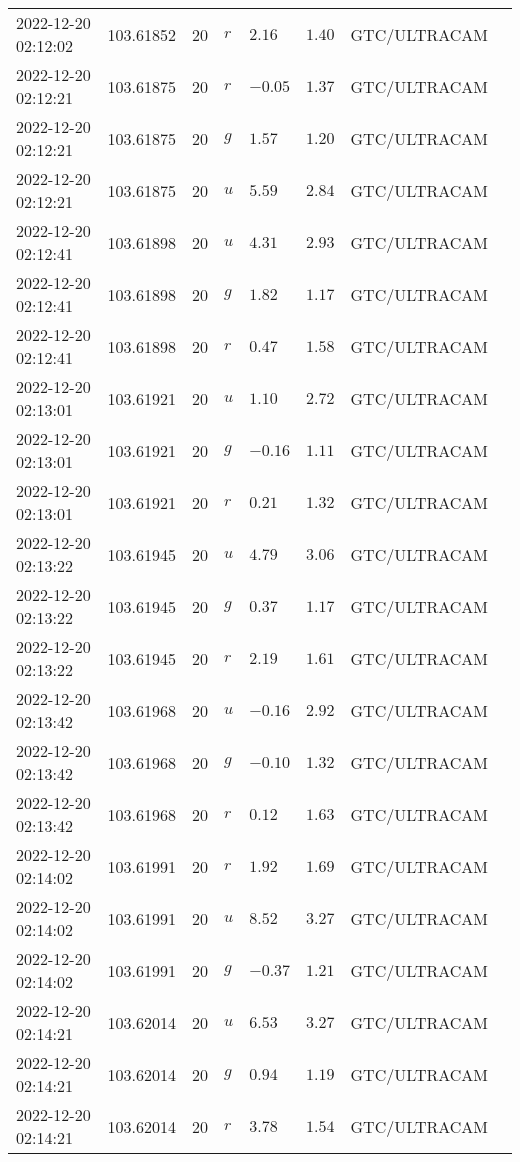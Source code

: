 \documentclass{nature_plusfigure}
\begin{document}
\begin{supplement}
\begin{center}
\begin{longtable}{llllllll}
2022-12-20 02:12:02 & 103.61852 & 20 & $r$ & $2.16$ & $1.40$ & GTC/ULTRACAM &  \\ 
2022-12-20 02:12:21 & 103.61875 & 20 & $r$ & $-0.05$ & $1.37$ & GTC/ULTRACAM &  \\ 
2022-12-20 02:12:21 & 103.61875 & 20 & $g$ & $1.57$ & $1.20$ & GTC/ULTRACAM &  \\ 
2022-12-20 02:12:21 & 103.61875 & 20 & $u$ & $5.59$ & $2.84$ & GTC/ULTRACAM &  \\ 
2022-12-20 02:12:41 & 103.61898 & 20 & $u$ & $4.31$ & $2.93$ & GTC/ULTRACAM &  \\ 
2022-12-20 02:12:41 & 103.61898 & 20 & $g$ & $1.82$ & $1.17$ & GTC/ULTRACAM &  \\ 
2022-12-20 02:12:41 & 103.61898 & 20 & $r$ & $0.47$ & $1.58$ & GTC/ULTRACAM &  \\ 
2022-12-20 02:13:01 & 103.61921 & 20 & $u$ & $1.10$ & $2.72$ & GTC/ULTRACAM &  \\ 
2022-12-20 02:13:01 & 103.61921 & 20 & $g$ & $-0.16$ & $1.11$ & GTC/ULTRACAM &  \\ 
2022-12-20 02:13:01 & 103.61921 & 20 & $r$ & $0.21$ & $1.32$ & GTC/ULTRACAM &  \\ 
2022-12-20 02:13:22 & 103.61945 & 20 & $u$ & $4.79$ & $3.06$ & GTC/ULTRACAM &  \\ 
2022-12-20 02:13:22 & 103.61945 & 20 & $g$ & $0.37$ & $1.17$ & GTC/ULTRACAM &  \\ 
2022-12-20 02:13:22 & 103.61945 & 20 & $r$ & $2.19$ & $1.61$ & GTC/ULTRACAM &  \\ 
2022-12-20 02:13:42 & 103.61968 & 20 & $u$ & $-0.16$ & $2.92$ & GTC/ULTRACAM &  \\ 
2022-12-20 02:13:42 & 103.61968 & 20 & $g$ & $-0.10$ & $1.32$ & GTC/ULTRACAM &  \\ 
2022-12-20 02:13:42 & 103.61968 & 20 & $r$ & $0.12$ & $1.63$ & GTC/ULTRACAM &  \\ 
2022-12-20 02:14:02 & 103.61991 & 20 & $r$ & $1.92$ & $1.69$ & GTC/ULTRACAM &  \\ 
2022-12-20 02:14:02 & 103.61991 & 20 & $u$ & $8.52$ & $3.27$ & GTC/ULTRACAM &  \\ 
2022-12-20 02:14:02 & 103.61991 & 20 & $g$ & $-0.37$ & $1.21$ & GTC/ULTRACAM &  \\ 
2022-12-20 02:14:21 & 103.62014 & 20 & $u$ & $6.53$ & $3.27$ & GTC/ULTRACAM &  \\ 
2022-12-20 02:14:21 & 103.62014 & 20 & $g$ & $0.94$ & $1.19$ & GTC/ULTRACAM &  \\ 
2022-12-20 02:14:21 & 103.62014 & 20 & $r$ & $3.78$ & $1.54$ & GTC/ULTRACAM &  \\ 

\end{longtable}
\end{center}
\end{supplement}
\end{document}

